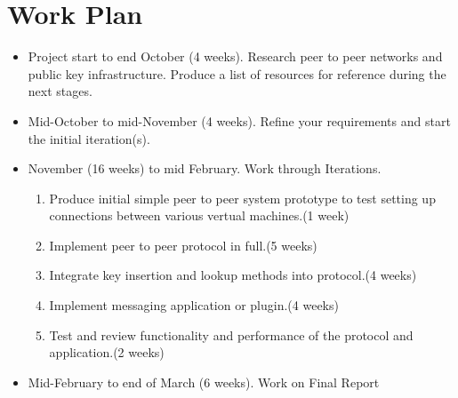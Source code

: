 \documentclass[
10pt, %
a4paper, %
oneside, %
headinclude,footinclude, %
BCOR5mm, %
]{scrartcl}
\begin{document}
\section{Work Plan}

\begin{itemize}
  \item Project start to end October (4 weeks). Research peer to peer networks and public key infrastructure. Produce a list of resources for reference during the next stages.
  \item Mid-October to mid-November (4 weeks). Refine your requirements and start the initial iteration(s).
  \item November (16 weeks) to mid February. Work through Iterations.
    \begin{enumerate}
      \item Produce initial simple peer to peer system prototype to test setting up connections between various vertual machines.(1 week)
      \item Implement peer to peer protocol in full.(5 weeks)
      \item Integrate key insertion and lookup methods into protocol.(4 weeks)
      \item Implement messaging application or plugin.(4 weeks)
      \item Test and review functionality and performance of the protocol and application.(2 weeks)
    \end{enumerate}
  \item Mid-February to end of March (6 weeks). Work on Final Report
\end{itemize}






\end{document}
